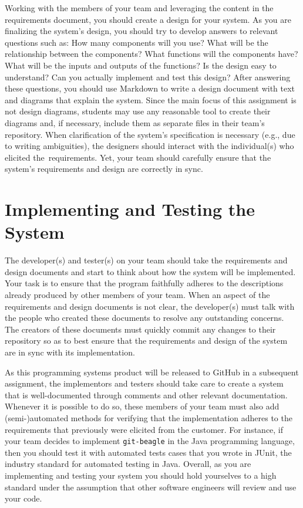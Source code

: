 Working with the members of your team and leveraging the content in the requirements document, you should create a
design for your system.  As you are finalizing the system's design, you should try to develop answers to relevant
questions such as: How many components will you use? What will be the relationship between the components? What
functions will the components have? What will be the inputs and outputs of the functions?  Is the design easy to
understand?  Can you actually implement and test this design? After answering these questions, you should use Markdown
to write a design document with text and diagrams that explain the system. Since the main focus of this assignment is
not design diagrams, students may use any reasonable tool to create their diagrams and, if necessary, include them as
separate files in their team's repository. When clarification of the system's specification is necessary (e.g., due to
writing ambiguities), the designers should interact with the individual(s) who elicited \mbox{the requirements}. Yet,
your team should carefully ensure that the system's requirements and design are correctly in sync.

\section*{Implementing and Testing the System}

The developer(s) and tester(s) on your team should take the requirements and design documents and start to think about
how the system will be implemented. Your task is to ensure that the program faithfully adheres to the descriptions
already produced by other members of your team. When an aspect of the requirements and design documents is not clear,
the developer(s) must talk with the people who created these documents to resolve any outstanding concerns. The creators
of these documents must quickly commit any changes to their repository so as to best ensure that the requirements and design
of the system are in sync with its implementation.

As this programming systems product will be released to GitHub in a subsequent assignment, the implementors and testers
should take care to create a system that is well-documented through comments and other relevant documentation. Whenever
it is possible to do so, these members of your team must also add (semi-)automated methods for verifying that the
implementation adheres to the requirements that previously were elicited from the customer. For instance, if your team
decides to implement {\tt git-beagle} in the Java programming language, then you should test it with automated tests
cases that you wrote in JUnit, the industry standard for automated testing in Java. Overall, as you are implementing and
testing your system you should hold yourselves to a high standard under the assumption that other software engineers
will review and use your code.

